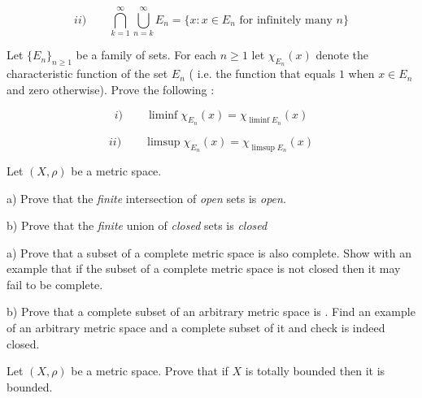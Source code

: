   $$ ii)  \qquad \bigcap_{k=1}^{\infty} \bigcup_{n=k}^{\infty} E_n = \{ x
: x \in E_n \text{ for infinitely many} \, \,  n \} $$
\endproclaim


  Let $\{E_n\}_{n\ge 1}$ be a family of sets. For
each $n \ge 1$ let $\chi_{E_n} (x)$ denote the characteristic function
of the set $E_n$ ( i.e. the function that equals $1$ when $x \in E_n$
and zero otherwise). Prove the following :

$$ i)\qquad \liminf \chi_{E_n} (x) = \chi_{\liminf E_n} (x) $$


$$ ii) \qquad \limsup \chi_{E_n} (x) = \chi_{\limsup E_n} (x) $$ 

\endproclaim 

 Let $(X, \rho)$ be a metric space.  

a) Prove that the {\it finite} intersection of {\it open } sets is {\it open}. 

b) Prove that the  {\it finite} union of {\it closed} sets is {\it
closed} 

\endproclaim




a) Prove that a  subset of a complete metric space is also complete. Show with an example that if the subset of a complete metric space 
is not closed then it may fail to be complete.

b) Prove that a complete subset of an arbitrary metric space is . 
Find an example of an arbitrary metric space and a complete 
subset of it and check is indeed closed. 

\endproclaim


 Let $(X, \rho)$ be a metric space. Prove that if $X$ is 
totally bounded then it  is bounded. 

\endproclaim











\enddocument























